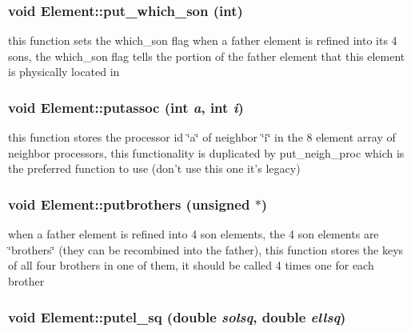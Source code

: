 \hypertarget{classElement_a44}{
\subsubsection[put\_\-which\_\-son]{\setlength{\rightskip}{0pt plus 5cm}void Element::put\_\-which\_\-son (int)}}
\label{classElement_a44}


this function sets the which\_\-son flag when a father element is refined into its 4 sons, the which\_\-son flag tells the portion of the father element that this element is physically located in 

\hypertarget{classElement_a17}{
\subsubsection[putassoc]{\setlength{\rightskip}{0pt plus 5cm}void Element::putassoc (int {\em a}, int {\em i})}}
\label{classElement_a17}


this function stores the processor id \char`\"{}a\char`\"{} of neighbor \char`\"{}i\char`\"{} in the 8 element array of neighbor processors, this functionality is duplicated by put\_\-neigh\_\-proc which is the preferred function to use (don't use this one it's legacy) 

\hypertarget{classElement_a15}{
\subsubsection[putbrothers]{\setlength{\rightskip}{0pt plus 5cm}void Element::putbrothers (unsigned $\ast$)}}
\label{classElement_a15}


when a father element is refined into 4 son elements, the 4 son elements are \char`\"{}brothers\char`\"{} (they can be recombined into the father), this function stores the keys of all four brothers in one of them, it should be called 4 times one for each brother 

\hypertarget{classElement_a25}{
\subsubsection[putel\_\-sq]{\setlength{\rightskip}{0pt plus 5cm}void Element::putel\_\-sq (double {\em solsq}, double {\em ellsq})}}
\label{classElement_a25}


